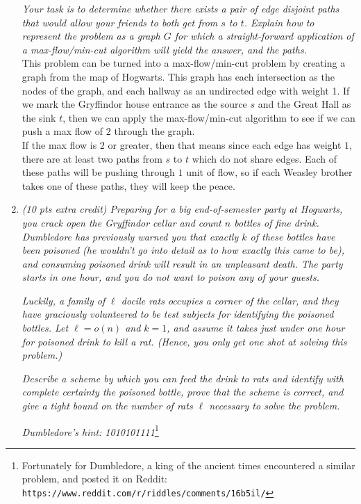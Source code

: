 \documentclass[12pt]{article}
\begin{document}
\begin{enumerate}
	\textit{Your task is to determine whether there exists a pair of edge disjoint paths that would allow your friends to both get from $s$ to $t$. Explain how to represent the problem as a graph $G$ for which a straight-forward application of a max-flow/min-cut algorithm will yield the answer, and the paths.}\\
	
	
	This problem can be turned into a max-flow/min-cut problem by creating a graph from the map of Hogwarts. This graph has each intersection as the nodes of the graph, and each hallway as an undirected edge with weight 1. If we mark the Gryffindor house entrance as the source $s$ and the Great Hall as the sink $t$, then we can apply the max-flow/min-cut algorithm to see if we can push a max flow of $2$ through the graph.\\
	
	If the max flow is $2$ or greater, then that means since each edge has weight $1$, there are at least two paths from $s$ to $t$ which do not share edges. Each of these paths will be pushing through $1$ unit of flow, so if each Weasley brother takes one of these paths, they will keep the peace.\\
	
	\newpage
	\item \textit{(10 pts extra credit) Preparing for a big end-of-semester party at Hogwarts, you crack open the Gryffindor cellar and count $n$ bottles of fine drink. Dumbledore has previously warned you that exactly $k$ of these bottles have been poisoned (he wouldn't go into detail as to how exactly this came to be), and consuming poisoned drink will result in an unpleasant death. The party starts in one hour, and you do not want to poison any of your guests.}
	
	\textit{Luckily, a family of $\ell$ docile rats occupies a corner of the cellar, and they have graciously volunteered to be test subjects for identifying the poisoned bottles. Let $\ell=o(n)$ and $k=1$, and assume it takes just under one hour for poisoned drink to kill a rat. (Hence, you only get one shot at solving this problem.)}
	
	\textit{Describe a scheme by which you can feed the drink to rats and identify with complete certainty the poisoned bottle, prove that the scheme is correct, and give a tight bound on the number of rats $\ell$ necessary to solve the problem.}
	
	\textit{Dumbledore's hint: 1010101111}\footnote{Fortunately for Dumbledore, a king of the ancient times encountered a similar problem, and posted it on Reddit: {\tt https://www.reddit.com/r/riddles/comments/16b5il/}}\\
	

\end{enumerate}
\end{document}
